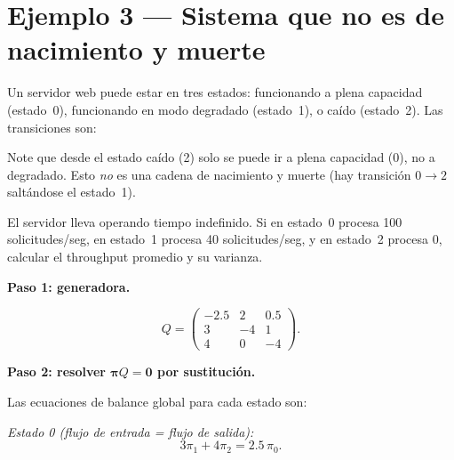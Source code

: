 \documentclass[11pt,a4paper]{article}
\theoremstyle{definition}
\theoremstyle{remark}
\begin{document}
\section{Ejemplo 3 --- Sistema que no es de nacimiento y muerte}

\begin{ejemplo}
Un servidor web puede estar en tres estados: funcionando a plena
capacidad (estado~0), funcionando en modo degradado (estado~1), o
caído (estado~2).  Las transiciones son:

\begin{center}
\end{center}

Note que desde el estado caído (2) solo se puede ir a plena capacidad
(0), no a degradado.  Esto \emph{no} es una cadena de nacimiento y
muerte (hay transición $0\to 2$ saltándose el estado~1).

El servidor lleva operando tiempo indefinido.  Si en estado~0 procesa
100 solicitudes/seg, en estado~1 procesa 40 solicitudes/seg, y en
estado~2 procesa 0, calcular el throughput promedio y su varianza.

\tcblower

\textbf{Paso 1: generadora.}

\[
  Q = \begin{pmatrix}
    -2.5 & 2 & 0.5 \\
    3 & -4 & 1 \\
    4 & 0 & -4
  \end{pmatrix}.
\]

\textbf{Paso 2: resolver $\boldsymbol{\pi}Q=\boldsymbol{0}$ por
sustitución.}

Las ecuaciones de balance global para cada estado son:

\emph{Estado 0 (flujo de entrada = flujo de salida):}
\[
  3\pi_1 + 4\pi_2 = 2.5\,\pi_0. \tag{E0}
\]


\end{ejemplo}
\end{document}

